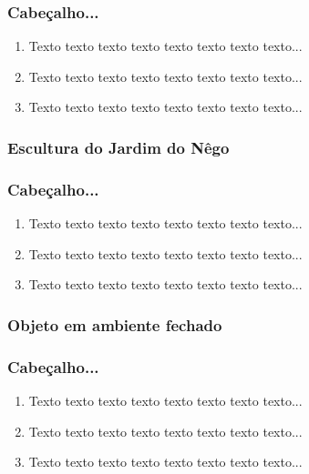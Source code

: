 \documentclass[table, usenames, svgnames, dvipsnames]{beamer}
\begin{document}
\begin{frame}
\frametitle{Cabeçalho...}
	\begin{enumerate}
    	\item Texto texto texto texto texto texto texto texto...
		\\[0.5em]

    	\item Texto texto texto texto texto texto texto texto...
		\\[0.5em]
    	
		\item Texto texto texto texto texto texto texto texto...
		\\[0.5em]
	\end{enumerate}
\end{frame}

\subsubsection{Escultura do Jardim do Nêgo}

\begin{frame}
\frametitle{Cabeçalho...}
	\begin{enumerate}
    	\item Texto texto texto texto texto texto texto texto...
		\\[0.5em]

    	\item Texto texto texto texto texto texto texto texto...
		\\[0.5em]
    	
		\item Texto texto texto texto texto texto texto texto...
		\\[0.5em]
	\end{enumerate}
\end{frame}

\subsubsection{Objeto em ambiente fechado}

\begin{frame}
\frametitle{Cabeçalho...}
	\begin{enumerate}
    	\item Texto texto texto texto texto texto texto texto...
		\\[0.5em]

    	\item Texto texto texto texto texto texto texto texto...
		\\[0.5em]
    	
		\item Texto texto texto texto texto texto texto texto...
		\\[0.5em]
	\end{enumerate}
\end{frame}
\end{document}
